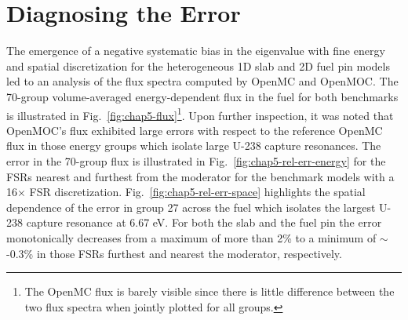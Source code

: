 \section{Diagnosing the Error}
\label{sec:chap5-diagnosis}

The emergence of a negative systematic bias in the eigenvalue with fine energy and spatial discretization for the heterogeneous 1D slab and 2D fuel pin models led to an analysis of the flux spectra computed by OpenMC and OpenMOC. The 70-group volume-averaged energy-dependent flux in the fuel for both benchmarks is illustrated in Fig.~\ref{fig:chap5-flux}\footnote{The OpenMC flux is barely visible since there is little difference between the two flux spectra when jointly plotted for all groups.}. Upon further inspection, it was noted that OpenMOC's flux exhibited large errors with respect to the reference OpenMC flux in those energy groups which isolate large U-238 capture resonances. The error in the 70-group flux is illustrated in Fig.~\ref{fig:chap5-rel-err-energy} for the \ac{FSR}s nearest and furthest from the moderator for the benchmark models with a 16$\times$ \ac{FSR} discretization. Fig.~\ref{fig:chap5-rel-err-space} highlights the spatial dependence of the error in group 27 across the fuel which isolates the largest U-238 capture resonance at 6.67 eV. For both the slab and the fuel pin the error monotonically decreases from a maximum of more than 2\% to a minimum of $\sim$-0.3\% in those \ac{FSR}s furthest and nearest the moderator, respectively. 

